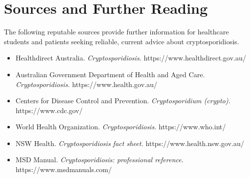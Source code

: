 \section*{Sources and Further Reading}
The following reputable sources provide further information for healthcare students and patients seeking reliable, current advice about cryptosporidiosis.

\begin{itemize}
    \item Healthdirect Australia. \textit{Cryptosporidiosis.} https://www.healthdirect.gov.au/
    \item Australian Government Department of Health and Aged Care. \textit{Cryptosporidiosis.} https://www.health.gov.au/
    \item Centers for Disease Control and Prevention. \textit{Cryptosporidium (crypto).} https://www.cdc.gov/
    \item World Health Organization. \textit{Cryptosporidiosis.} https://www.who.int/
    \item NSW Health. \textit{Cryptosporidiosis fact sheet.} https://www.health.nsw.gov.au/
    \item MSD Manual. \textit{Cryptosporidiosis: professional reference.} https://www.msdmanuals.com/
\end{itemize}
